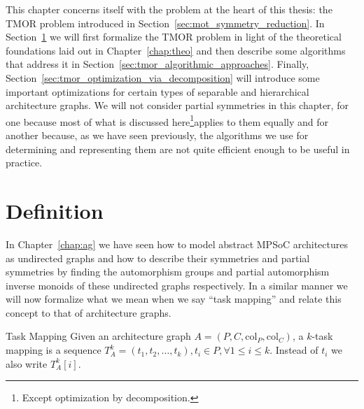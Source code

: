 This chapter concerns itself with the problem at the heart of this thesis: the
TMOR problem introduced in Section~\ref{sec:mot_symmetry_reduction}. In
Section~\ref{sec:tmor_definition} we will first formalize the TMOR problem in
light of the theoretical foundations laid out in Chapter~\ref{chap:theo} and
then describe some algorithms that address it in
Section~\ref{sec:tmor_algorithmic_approaches}. Finally,
Section~\ref{sec:tmor_optimization_via_decomposition} will introduce some
important optimizations for certain types of separable and hierarchical
architecture graphs. We will not consider partial symmetries in this chapter,
for one because most of what is discussed here\footnote{Except optimization by
decomposition.}applies to them equally and for another because, as we have seen
previously, the algorithms we use for determining and representing them are not
quite efficient enough to be useful in practice.

\section{Definition}
\label{sec:tmor_definition}

In Chapter~\ref{chap:ag} we have seen how to model abstract MPSoC architectures
as undirected graphs and how to describe their symmetries and partial
symmetries by finding the automorphism groups and partial automorphism inverse
monoids of these undirected graphs respectively. In a similar manner we will now
formalize what we mean when we say ``task mapping'' and relate this concept
to that of architecture graphs.

\begin{defn}{Task Mapping}
  Given an architecture graph $A = (P, C, \mathrm{col}_P,
  \mathrm{col}_C)$, a $k$-task mapping is a sequence $T_A^k = (t_1, t_2,
  \dots, t_k), t_i \in P, \forall 1 \leq i \leq k$. Instead of $t_i$ we also
  write $T_{A}^k[i]$.
\end{defn}

